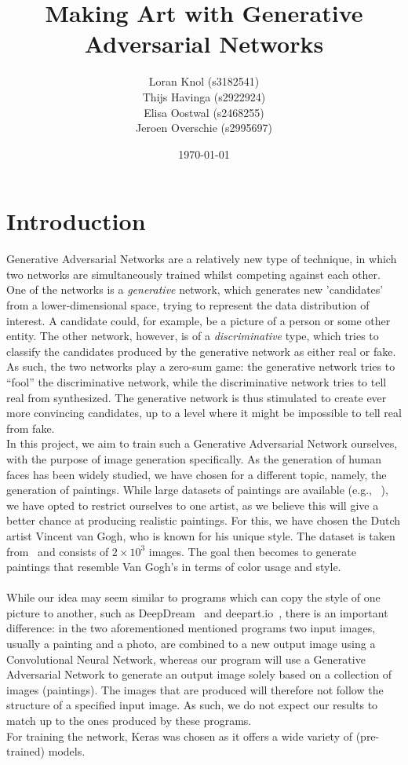 \documentclass{article}
\title{Making Art with Generative Adversarial Networks}
\author{Loran Knol (s3182541)\\Thijs Havinga (s2922924)\\Elisa Oostwal (s2468255)\\Jeroen Overschie (s2995697)}
\date{\today}
\begin{document}
\maketitle

\section*{Introduction}

Generative Adversarial Networks are a relatively new type of technique, in which two networks are simultaneously trained whilst competing against each other. One of the networks is a \textit{generative} network, which generates new 'candidates' from a lower-dimensional space, trying to represent the data distribution of interest. A candidate could, for example, be a picture of a person or some other entity. The other network, however, is of a \textit{discriminative} type, which tries to classify the candidates produced by the generative network as either real or fake. As such, the two networks play a zero-sum game: the generative network tries to ``fool'' the discriminative network, while the discriminative network tries to tell real from synthesized. The generative network is thus stimulated to create ever more convincing candidates, up to a level where it might be impossible to tell real from fake.\\

In this project, we aim to train such a Generative Adversarial Network ourselves, with the purpose of image generation specifically. As the generation of human faces has been widely studied, we have chosen for a different topic, namely, the generation of paintings. While large datasets of paintings are available (e.g., ~\cite{kaggle_rijksmuseum}), we have opted to restrict ourselves to one artist, as we believe this will give a better chance at producing realistic paintings. For this, we have chosen the Dutch artist Vincent van Gogh, who is known for his unique style. The dataset is taken from~\cite{kaggle_van_gogh} and consists of $2 \times 10^3$ images. The goal then becomes to generate paintings that resemble Van Gogh's in terms of color usage and style.\\
\\
While our idea may seem similar to programs which can copy the style of one picture to another, such as DeepDream~\cite{deepdream} and deepart.io~\cite{deepart}, there is an important difference: in the two aforementioned mentioned programs two input images, usually a painting and a photo, are combined to a new output image using a Convolutional Neural Network, whereas our program will use a Generative Adversarial Network to generate an output image solely based on a collection of images (paintings). The images that are produced will therefore not follow the structure of a specified input image. As such, we do not expect our results to match up to the ones produced by these programs.\\


For training the network, Keras was chosen as it offers a wide variety of (pre-trained) models.



\printbibliography
\end{document}

